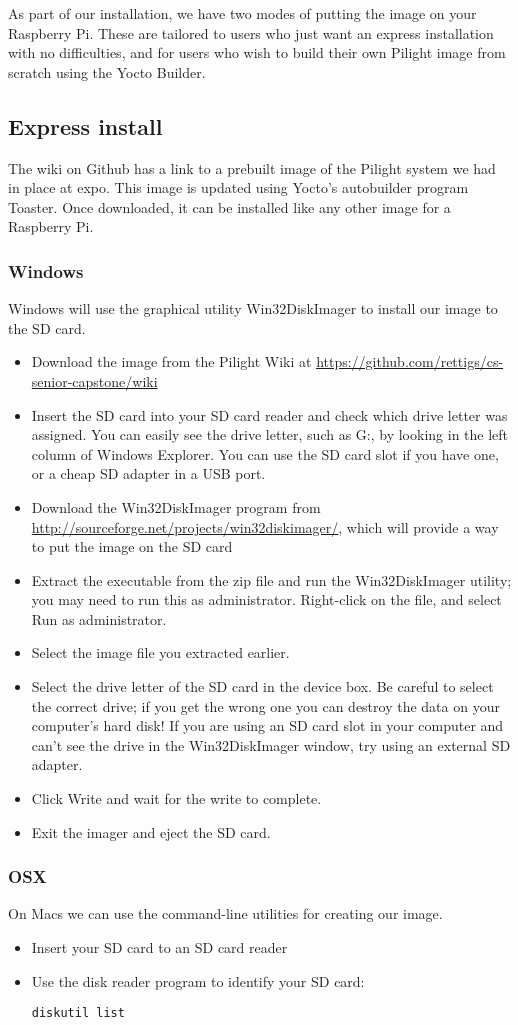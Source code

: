 As part of our installation, we have two modes of putting the image on your Raspberry Pi. These are tailored to users who just want an express installation with no difficulties, and for users who wish to build their own Pilight image from scratch using the Yocto Builder.
\subsection{Express install}
The wiki on Github has a link to a prebuilt image of the Pilight system we had in place at expo. This image is updated using Yocto's autobuilder program Toaster. Once downloaded, it can be installed like any other image for a Raspberry Pi.
\subsubsection{Windows}
Windows will use the graphical utility Win32DiskImager to install our image to the SD card.
\begin{itemize}
\item Download the image from the Pilight Wiki at \url{https://github.com/rettigs/cs-senior-capstone/wiki}
\item Insert the SD card into your SD card reader and check which drive letter was assigned. You can easily see the drive letter, such as G:, by looking in the left column of Windows Explorer. You can use the SD card slot if you have one, or a cheap SD adapter in a USB port.
\item Download the Win32DiskImager program from \url{http://sourceforge.net/projects/win32diskimager/}, which will provide a way to put the image on the SD card
\item Extract the executable from the zip file and run the Win32DiskImager utility; you may need to run this as administrator. Right-click on the file, and select Run as administrator.
\item Select the image file you extracted earlier.
\item Select the drive letter of the SD card in the device box. Be careful to select the correct drive; if you get the wrong one you can destroy the data on your computer's hard disk! If you are using an SD card slot in your computer and can't see the drive in the Win32DiskImager window, try using an external SD adapter.
\item Click Write and wait for the write to complete.
\item Exit the imager and eject the SD card.
\end{itemize}
\subsubsection{OSX}
On Macs we can use the command-line utilities for creating our image.
\begin{itemize}
\item Insert your SD card to an SD card reader
\item Use the disk reader program to identify your SD card:
\begin{lstlisting}
diskutil list
\end{lstlisting}
\end{itemize}
